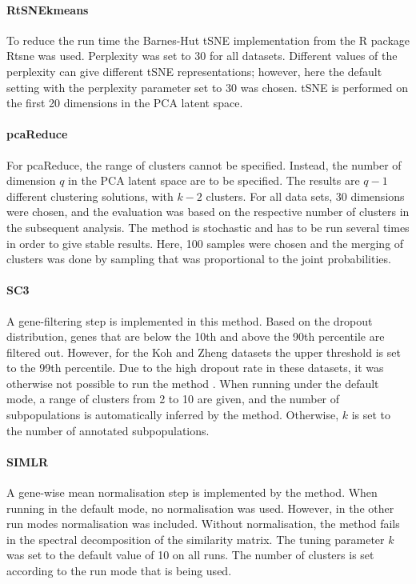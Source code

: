 \documentclass[12pt, a4paper]{article}\usepackage[]{graphicx}\usepackage[]{color}
\begin{document}
\paragraph{RtSNEkmeans}
To reduce the run time the Barnes-Hut tSNE implementation from the R package Rtsne was used. Perplexity was set to 30 for all datasets. Different values of the perplexity can give different tSNE representations; however, here the default setting with the perplexity parameter set to 30 was chosen. tSNE is performed on the first 20 dimensions in the PCA latent space. 
\paragraph{pcaReduce}
For pcaReduce, the range of clusters cannot be specified. Instead, the number of dimension $q$ in the PCA latent space are to be specified. The results are $q-1$ different clustering solutions, with $k-2$ clusters. For all data sets, 30 dimensions were chosen, and the evaluation was based on the respective number of clusters in the subsequent analysis. The method is stochastic and has to be run several times in order to give stable results. Here, 100 samples were chosen and the merging of clusters was done by sampling that was proportional to the joint probabilities. 
\paragraph{SC3}
A gene-filtering step is implemented in this method. Based on the dropout distribution, genes that are below the 10th and above the 90th percentile are filtered out. However, for the Koh and Zheng datasets the upper threshold is set to the 99th percentile. Due to the high dropout rate in these datasets, it was otherwise not possible to run the method .
When running under the default mode, a range of clusters from 2 to 10 are given, and the number of subpopulations is automatically inferred by the method. Otherwise, $k$ is set to the number of annotated subpopulations. 
\paragraph{SIMLR}
A gene-wise mean normalisation step is implemented by the method. When running in the default mode, no normalisation was used. However, in the other run modes normalisation was included. Without normalisation, the method fails in the spectral decomposition of the similarity matrix. 
The tuning parameter $k$ was set to the default value of 10 on all runs. The number of clusters is set according to the run mode that is being used.
\end{document}
